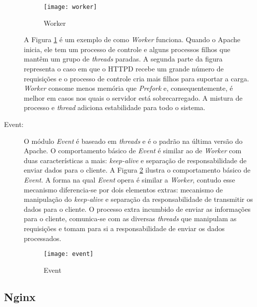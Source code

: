 \begin{description}
\begin{figure}[!h]
  \centering
  \texttt{[image: worker]} 
  \caption{Worker}
  \label{fig:worker} 
\end{figure}

A Figura \ref{fig:worker} é um exemplo de como \emph{Worker} funciona.
Quando o Apache inicia, ele tem um processo de controle e alguns processos
filhos que mantêm um grupo de \emph{threads} paradas. A segunda parte da figura
representa o caso em que o HTTPD recebe um grande número de requisições e o
processo de controle cria mais filhos para suportar a carga. \emph{Worker}
consome menos memória que \emph{Prefork} e, consequentemente, é melhor em
casos nos quais o servidor está sobrecarregado.  A mistura de processo e \emph{thread}
adiciona estabilidade para todo o sistema.

	\item [Event:] O módulo \emph{Event} é baseado em \emph{threads} e é o padrão na
última versão do Apache. O comportamento básico de \emph{Event} é similar ao
de \emph{Worker} com duas características a mais: \emph{keep-alive} e
separação de responsabilidade de enviar dados para o cliente. A Figura
\ref{fig:event} ilustra o comportamento básico de \emph{Event}. A forma na qual
\emph{Event} opera é similar a \emph{Worker}, contudo esse mecanismo
diferencia-se por dois elementos extras: mecanismo de manipulação do \emph{keep-alive}
e separação da responsabilidade de transmitir os dados para o cliente. O
processo extra incumbido de enviar as informações para o cliente, comunica-se
com as diversas \emph{threads} que manipulam as requisições e tomam para si a
responsabilidade de enviar os dados processados.

\begin{figure}[!h]
  \centering
  \texttt{[image: event]} 
  \caption{Event}
  \label{fig:event} 
\end{figure}

\end{description}

\subsection{Nginx}

